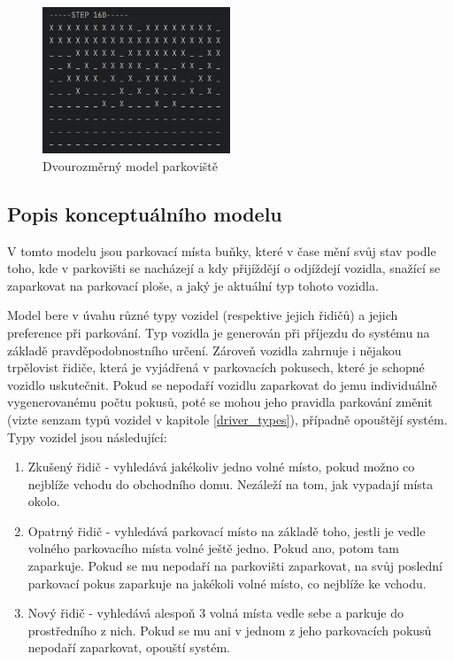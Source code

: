 \documentclass[11pt, a4paper]{article}
\begin{document}
\begin{figure}[ht]
  \centering
  \includegraphics[width=0.5\textwidth]{img/parking_lot.png}
  \caption{Dvourozměrný model parkoviště}
  \label{parking_lot}
\end{figure}

\subsection{Popis konceptuálního modelu}

V tomto modelu jsou parkovací místa buňky, které v čase mění svůj stav podle toho, kde v parkovišti se nacházejí a kdy přijíždějí o odjíždejí vozidla, snažící se zaparkovat na parkovací ploše, a jaký je aktuální typ tohoto vozidla.

Model bere v úvahu různé typy vozidel (respektive jejich řidičů) a jejich preference při parkování. Typ vozidla je generován při příjezdu do systému na základě pravděpodobnostního určení. Zároveň vozidla zahrnuje i nějakou trpělovist řidiče, která je vyjádřená v parkovacích pokusech, které je schopné vozidlo uskutečnit. Pokud se nepodaří vozidlu zaparkovat do jemu individuálně vygenerovanému počtu pokusů, poté se mohou jeho pravidla parkování změnit (vizte senzam typů vozidel v kapitole \ref{driver_types}), případně opouštějí systém. Typy vozidel jsou následující: 

\label{driver_types}
\begin{enumerate}
    \item Zkušený řidič - vyhledává jakékoliv jedno volné místo, pokud možno co nejblíže vchodu do obchodního domu. Nezáleží na tom, jak vypadají místa okolo.
    \item Opatrný řidič - vyhledává parkovací místo na základě toho, jestli je vedle volného parkovacího místa volné ještě jedno. Pokud ano, potom tam zaparkuje. Pokud se mu nepodaří na parkovišti zaparkovat, na svůj poslední parkovací pokus zaparkuje na jakékoli volné místo, co nejblíže ke vchodu.
    \item Nový řidič - vyhledává alespoň 3 volná místa vedle sebe a parkuje do prostředního z nich. Pokud se mu ani v jednom z jeho parkovacích pokusů nepodaří zaparkovat, opouští systém.
\end{enumerate}
\end{document}
